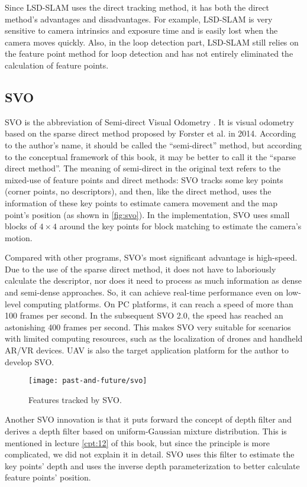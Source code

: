 Since LSD-SLAM uses the direct tracking method, it has both the direct method's advantages and disadvantages. For example, LSD-SLAM is very sensitive to camera intrinsics and exposure time and is easily lost when the camera moves quickly. Also, in the loop detection part, LSD-SLAM still relies on the feature point method for loop detection and has not entirely eliminated the calculation of feature points.

\subsection{SVO}
SVO is the abbreviation of Semi-direct Visual Odometry \cite{Forster2014}. It is visual odometry based on the sparse direct method proposed by Forster et al. in 2014. According to the author's name, it should be called the ``semi-direct'' method, but according to the conceptual framework of this book, it may be better to call it the ``sparse direct method''. The meaning of semi-direct in the original text refers to the mixed-use of feature points and direct methods: SVO tracks some key points (corner points, no descriptors), and then, like the direct method, uses the information of these key points to estimate camera movement and the map point's position (as shown in \autoref{fig:svo}). In the implementation, SVO uses small blocks of $4\times4$ around the key points for block matching to estimate the camera's motion.

Compared with other programs, SVO's most significant advantage is high-speed. Due to the use of the sparse direct method, it does not have to laboriously calculate the descriptor, nor does it need to process as much information as dense and semi-dense approaches. So, it can achieve real-time performance even on low-level computing platforms. On PC platforms, it can reach a speed of more than 100 frames per second. In the subsequent SVO 2.0, the speed has reached an astonishing 400 frames per second. This makes SVO very suitable for scenarios with limited computing resources, such as the localization of drones and handheld AR/VR devices. UAV is also the target application platform for the author to develop SVO.

\begin{figure}[!htp]
	\centering
	\texttt{[image: past-and-future/svo]}
	\caption{Features tracked by SVO.}
	\label{fig:svo}
\end{figure}

Another SVO innovation is that it puts forward the concept of depth filter and derives a depth filter based on uniform-Gaussian mixture distribution. This is mentioned in lecture \ref{cpt:12} of this book, but since the principle is more complicated, we did not explain it in detail. SVO uses this filter to estimate the key points' depth and uses the inverse depth parameterization to better calculate feature points' position.

